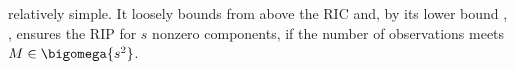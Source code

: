 relatively simple.
It loosely bounds from above
the \ac{RIC}
\cite[Prop. 6.2]{book:Foucart2013} and, by
its  lower bound
\cite[Thm. 5.7]{book:Foucart2013},
\cite[Lem. 3.7]{article:KutyniokGAMM2013}, ensures
the \ac{RIP} for
$s$ nonzero components, if
the number of
observations meets
$M \in \bigomega{ s^{2} }$.

